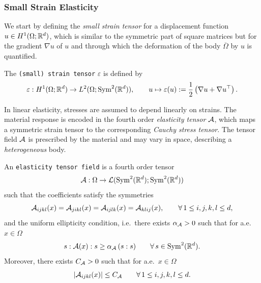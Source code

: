 \subsubsection{Small Strain Elasticity}

We start by defining the {\em small strain tensor} for a displacement function $u\in H^1(\Omega;{\mathbb R}^d)$, which is similar to the symmetric part of square matrices but for the gradient $\nabla u$ of $u$ and through which the deformation of the body $\overline{\Omega}$ by $u$ is quantified.
\begin{definition}
	The {\tt (small) strain tensor} $\varepsilon$ is defined by
	\begin{equation*}
		\varepsilon:H^1(\Omega;{\mathbb R}^d)\to L^2(\Omega;\mathrm{Sym}^2({\mathbb R}^d)),\qquad u\mapsto \varepsilon(u):= \frac{1}{2}\left(\nabla u + \nabla u^\top\right).
	\end{equation*}
\end{definition}
In linear elasticity, stresses are assumed to depend linearly on strains. The material response is encoded in the fourth order {\em elasticity tensor} ${\mathcal A}$, which maps a symmetric strain tensor to the corresponding {\em Cauchy stress tensor}. The tensor field ${\mathcal A}$ is prescribed by the material and may vary in space, describing a {\em heterogeneous} body.
\begin{definition}\label{def:elastfield}
	An {\tt elasticity tensor field} is a fourth order tensor
	\begin{equation*}
		{\mathcal A}:\Omega\to {\mathcal L}(\mathrm{Sym}^2({\mathbb R}^d);\mathrm{Sym}^2({\mathbb R}^d))
	\end{equation*}
	such that the coefficients satisfy the symmetries
	\begin{equation*}
		{\mathcal A}_{ijkl}(x)={\mathcal A}_{jikl}(x)={\mathcal A}_{ijlk}(x)={\mathcal A}_{klij}(x),
		\qquad \forall\,1\le i,j,k,l\le d,
	\end{equation*}
	and the uniform ellipticity condition, i.e.\ there exists $\alpha_{\mathcal A}>0$ such that for a.e.\ $x\in\Omega$
	\begin{equation*}
		s:{\mathcal A}(x):s \ge \alpha_{\mathcal A}\, (s:s)\qquad \forall\,s\in \mathrm{Sym}^2({\mathbb R}^d).
	\end{equation*}
	Moreover, there exists $C_{\mathcal A}>0$ such that for a.e.\ $x\in\Omega$
	\begin{equation*}
		|{\mathcal A}_{ijkl}(x)|\le C_{\mathcal A} \qquad \forall\,1\le i,j,k,l\le d.
	\end{equation*}
\end{definition}


